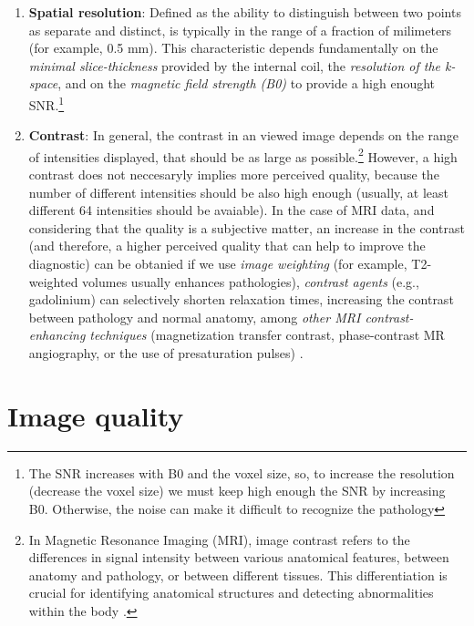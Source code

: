 \begin{enumerate}
\item \textbf{Spatial resolution}: Defined as the ability to
  distinguish between two points as separate and distinct, is
  typically in the range of a fraction of milimeters (for example, 0.5
  mm). This characteristic depends fundamentally on the \emph{minimal
    slice-thickness} provided by the internal coil, the
  \emph{resolution of the k-space}, and on the \emph{magnetic field
    strength (B0)} to provide a high enought SNR.\footnote{The SNR
    increases with B0 and the voxel size, so, to increase the
    resolution (decrease the voxel size) we must keep high enough the
    SNR by increasing B0. Otherwise, the noise can make it difficult
    to recognize the pathology}
\item \textbf{Contrast}: In general, the contrast in an viewed image
  depends on the range of intensities displayed, that should be as
  large as possible.\footnote{In Magnetic Resonance Imaging (MRI),
    image contrast refers to the differences in signal intensity
    between various anatomical features, between anatomy and
    pathology, or between different tissues. This differentiation is
    crucial for identifying anatomical structures and detecting
    abnormalities within the body \cite{westbrook2018mri}.} However, a
  high contrast does not neccesaryly implies more perceived quality,
  because the number of different intensities should be also high
  enough (usually, at least different 64 intensities should be
  avaiable). In the case of MRI data, and considering that the quality
  is a subjective matter, an increase in the contrast (and therefore,
  a higher perceived quality that can help to improve the diagnostic)
  can be obtanied if we use \emph{image weighting} (for example,
  T2-weighted volumes usually enhances pathologies), \emph{contrast agents}
  (e.g., gadolinium) can selectively shorten relaxation times,
  increasing the contrast between pathology and normal anatomy, among
  \emph{other MRI contrast-enhancing techniques} (magnetization
  transfer contrast, phase-contrast MR angiography, or the use of
  presaturation pulses) \cite{westbrook2018mri}.
\end{enumerate}

\section{Image quality}

